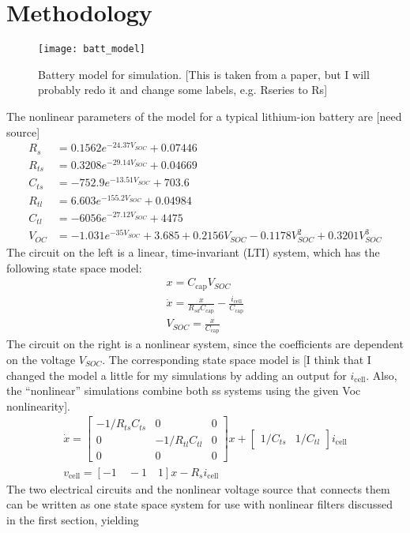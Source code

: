 \chapter{Methodology}


\begin{figure}
\centering
\texttt{[image: batt\_model]}
\caption{Battery model for simulation. [This is taken from a paper, but I will probably redo it and change some labels, e.g. Rseries to Rs]}
\label{fig:batt_model}
\end{figure}

The nonlinear parameters of the model for a typical lithium-ion battery are [need source]
\begin{align}
	R_s &= 0.1562 e^{-24.37 V_{SOC}} + 0.07446 \\
	R_{ts} &= 0.3208 e^{-29.14 V_{SOC}} + 0.04669 \\
	C_{ts} &= -752.9 e^{-13.51 V_{SOC}} + 703.6 \\
	R_{tl} &= 6.603 e^{-155.2 V_{SOC}} + 0.04984 \\
	C_{tl} &= -6056 e^{-27.12 V_{SOC}} + 4475 \\
	V_{OC} &= -1.031 e^{-35 V_{SOC}} + 3.685 + 0.2156 V_{SOC} - 0.1178 V_{SOC}^2 + 0.3201 V_{SOC}^3
\end{align}
The circuit on the left is a linear, time-invariant (LTI) system, which has the following state space model:
\begin{gather}
    x = C_\text{cap} V_{SOC} \\
    \dot{x} = \frac{x}{R_{sd} C_\text{cap}} - \frac{i_\text{cell}}{C_\text{cap}} \\
    V_{SOC} = \frac{x}{C_\text{cap}}
\end{gather}
The circuit on the right is a nonlinear system, since the coefficients are dependent on the voltage $V_{SOC}$. The corresponding state space model is [I think that I changed the model a little for my simulations by adding an output for $i_\text{cell}$. Also, the ``nonlinear'' simulations combine both ss systems using the given Voc nonlinearity].
\begin{gather}
	\dot{x} = \begin{bmatrix}
		-1/R_{ts}C_{ts} & 0 & 0 \\
		0 & -1/R_{tl}C_{tl} & 0 \\
		0 & 0 & 0
		\end{bmatrix} x 
		+ \begin{bmatrix} 1/C_{ts} & 1/C_{tl} \end{bmatrix} i_\text{cell} \\
	v_\text{cell} = [-1 \quad -1 \quad 1] x - R_s i_\text{cell}
\end{gather}
The two electrical circuits and the nonlinear voltage source that connects them can be written as one state space system for use with nonlinear filters discussed in the first section, yielding

